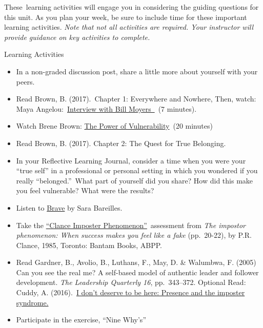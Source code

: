 \documentclass[
]{book}
\providecommand{\tightlist}{%
  \setlength{\itemsep}{0pt}\setlength{\parskip}{0pt}}
\begin{document}
These~learning activities will engage you in considering the guiding questions for this unit. As you plan your week, be sure to include time for these important learning activities. \emph{Note that not all activities are required. Your instructor will provide guidance on key activities to complete.}

\begin{reflect}
{Learning Activities}

\begin{itemize}
\tightlist
\item
  In a non-graded discussion post, share a little more about yourself
  with your peers.\\
\item
  Read Brown, B. (2017).~Chapter 1: Everywhere and Nowhere, Then, watch:
  Maya
  Angelou:~\href{http://billmoyers.com/content/conversation-maya-angelou/}{Interview
  with Bill Moyers~}~(7 minutes).\\
\item
  Watch Brene Brown:
  \href{https://www.ted.com/talks/brene_brown_on_vulnerability}{The
  Power of Vulnerability}~(20 minutes)\\
\item
  Read Brown, B. (2017). Chapter 2: The Quest for True Belonging.\\
\item
  In your Reflective Learning Journal, consider a time when you were
  your ``true self'' in a professional or personal setting in which you
  wondered if you really ``belonged.''~What part of yourself did you
  share? How did this make you feel vulnerable? What were the results?\\
\item
  Listen to \href{https://www.youtube.com/watch?v=QUQsqBqxoR4}{Brave} by
  Sara Bareilles.\\
\item
  Take the
  \href{https://paulineroseclance.com/pdf/IPscoringtest.pdf}{``Clance
  Imposter Phenomenon''}~assessment from \emph{The impostor phenomenon:
  When success makes you feel like a fake} (pp.~20-22), by P.R. Clance,
  1985, Toronto: Bantam Books, ABPP.\\
\item
  Read Gardner, B., Avolio, B., Luthans, F., May, D. \& Walumbwa, F.
  (2005) Can you see the real me? A self-based model of authentic leader
  and follower development. \emph{The Leadership Quarterly 16},
  pp.~343--372. Optional Read: Cuddy, A.
  (2016).~\href{https://leanin.org/news-inspiration/overcoming-imposter-syndrome-to-reveal-your-presence}{I
  don't deserve to be here: Presence and the imposter syndrome.}\\
\item
  Participate in the exercise, ``Nine Why's''
\end{itemize}
\end{reflect}
\end{document}
